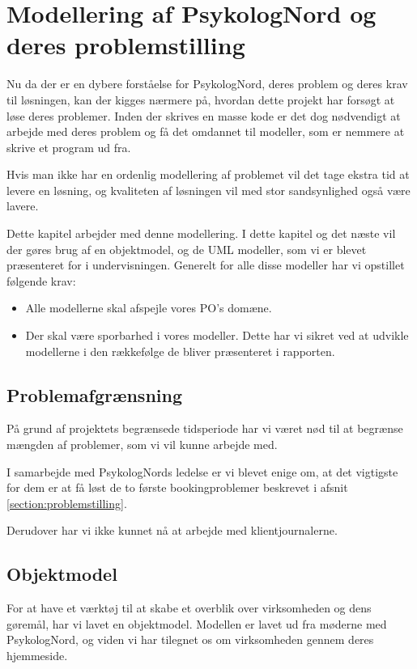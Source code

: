 \section{Modellering af PsykologNord og deres problemstilling}
\label{kabitel:ModelleringPN}

Nu da der er en dybere forståelse for PsykologNord, deres problem og deres krav til løsningen, kan der kigges nærmere på, hvordan dette projekt har forsøgt at løse deres problemer.
Inden der skrives en masse kode er det dog nødvendigt at arbejde med deres problem og få det omdannet til modeller, som er nemmere at skrive et program ud fra.

Hvis man ikke har en ordenlig modellering af problemet vil det tage ekstra tid at levere en løsning, og kvaliteten af løsningen vil med stor sandsynlighed også være lavere.

Dette kapitel arbejder med denne modellering.
I dette kapitel og det næste vil der gøres brug af en objektmodel, og de UML modeller, som vi er blevet præsenteret for i undervisningen.
Generelt for alle disse modeller har vi opstillet følgende krav:

\begin{itemize}
    \item Alle modellerne skal afspejle vores PO's domæne.
    \item Der skal være sporbarhed i vores modeller. Dette har vi sikret ved at udvikle modellerne i den rækkefølge de bliver præsenteret i rapporten.
\end{itemize}


\subsection{Problemafgrænsning}
\label{problemafgraensning}
På grund af projektets begrænsede tidsperiode har vi været nød til at begrænse mængden af problemer, som vi vil kunne arbejde med.

I samarbejde med PsykologNords ledelse er vi blevet enige om, at det vigtigste for dem er at få løst de to første bookingproblemer beskrevet i afsnit \ref{section:problemstilling}.

Derudover har vi ikke kunnet nå at arbejde med klientjournalerne.

\subsection{Objektmodel}
\label{objektmodel}

For at have et værktøj til at skabe et overblik over virksomheden og dens gøremål, har vi lavet en objektmodel.
Modellen er lavet ud fra møderne med PsykologNord, og viden vi har tilegnet os om virksomheden gennem deres hjemmeside.\cite{psykolognord}

